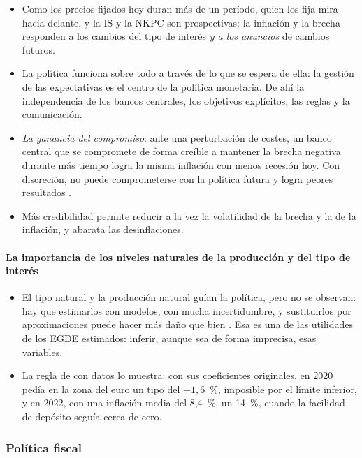 \documentclass[11pt]{article}
\begin{document}
\begin{itemize}
\item Como los precios fijados hoy duran más de un período, quien los fija mira hacia delante, y la IS y la NKPC son prospectivas: la inflación y la brecha responden a los cambios del tipo de interés \emph{y a los anuncios} de cambios futuros.
\item La política funciona sobre todo a través de lo que se espera de ella: la gestión de las expectativas es el centro de la política monetaria\nocite{Woodford2003Interest}. De ahí la independencia de los bancos centrales, los objetivos explícitos, las reglas y la comunicación.
\item \emph{La ganancia del compromiso}: ante una perturbación de costes, un banco central que se compromete de forma creíble a mantener la brecha negativa durante más tiempo logra la misma inflación con menos recesión hoy. Con discreción, no puede comprometerse con la política futura y logra peores resultados\nocite{ClaridaGaliGertler1999Science} .
\item Más credibilidad permite reducir a la vez la volatilidad de la brecha y la de la inflación, y abarata las desinflaciones.
\end{itemize}

\paragraph{La importancia de los niveles naturales de la producción y del tipo de interés}

\begin{itemize}
\item El tipo natural y la producción natural guían la política, pero no se observan: hay que estimarlos con modelos, con mucha incertidumbre, y sustituirlos por aproximaciones puede hacer más daño que bien . Esa es una de las utilidades de los EGDE estimados: inferir, aunque sea de forma imprecisa, esas variables.
\item La regla de  con datos lo muestra: con sus coeficientes originales, en 2020 pedía en la zona del euro un tipo del $-1{,}6$~\%, imposible por el límite inferior, y en 2022, con una inflación media del 8,4~\%, un 14~\%, cuando la facilidad de depósito seguía cerca de cero\nocite{BCE2026Tipos,Eurostat2026IAPC,CE2026AMECOBrecha}.
\end{itemize}

\subsubsection{Política fiscal}\label{sec:politica-fiscal}
\end{document}
